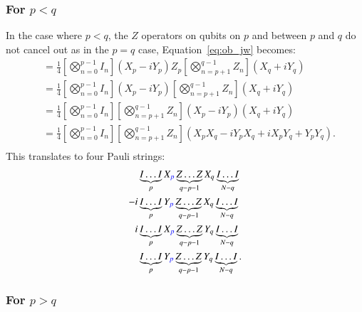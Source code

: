 \subsubsection{For $p < q$}%
\label{ssub:p_lessthan_q}
In the case where $ p < q $, the $ Z $ operators on qubits on $ p $ and between $ p $ and $ q $ do not cancel out as in the $ p=q $ case, Equation~\eqref{eq:ob_jw} becomes:
\begin{equation}
	\label{eq:jw_p_lessthan_q}
	\begin{aligned}
		&= \frac{1}{4} \left[ \bigotimes_{n=0}^{p-1} I_n \right] \left( X_p - i Y_p \right)Z_p 
		\left[ \bigotimes_{n=p+1}^{q-1} Z_n \right]  \left( X_q + i Y_q \right) \\
		&= \frac{1}{4} \left[ \bigotimes_{n=0}^{p-1} I_n \right] \left( X_p - i Y_p \right) \left[ \bigotimes_{n=p+1}^{q-1} Z_n \right]  \left( X_q + i Y_q \right) \\
		&= \frac{1}{4} \left[ \bigotimes_{n=0}^{p-1} I_n \right] \left[ \bigotimes_{n=p+1}^{q-1} Z_n \right] \left( X_p - i Y_p \right)   \left( X_q + i Y_q \right) \\
		&= \frac{1}{4} \left[ \bigotimes_{n=0}^{p-1} I_n \right] \left[ \bigotimes_{n=p+1}^{q-1} Z_n \right] \left( X_pX_q - iY_pX_q + iX_pY_q + Y_pY_q \right). \\
	\end{aligned} 
\end{equation}
This translates to four Pauli strings:
\begin{align}
	\label{eq:p_lessthan_q}
	&\underbrace{I\ldots I}_{p}X_{{\color{blue}p}} \underbrace{Z\ldots Z}_{q-p-1}X_q \underbrace{I\ldots I}_{N-q} \\
	-i &\underbrace{I\ldots I}_{p}Y_{{\color{blue}p}} \underbrace{Z\ldots Z}_{q-p-1}X_q \underbrace{I\ldots I}_{N-q} \\
	i &\underbrace{I\ldots I}_{p}X_{{\color{blue}p}} \underbrace{Z\ldots Z}_{q-p-1}Y_q \underbrace{I\ldots I}_{N-q} \\
	  &\underbrace{I\ldots I}_{p}Y_{{\color{blue}p}} \underbrace{Z\ldots Z}_{q-p-1}Y_q \underbrace{I\ldots I}_{N-q}.
\end{align}

\subsubsection{For $p > q$}%
\label{ssub:p_greaterthan_q}

